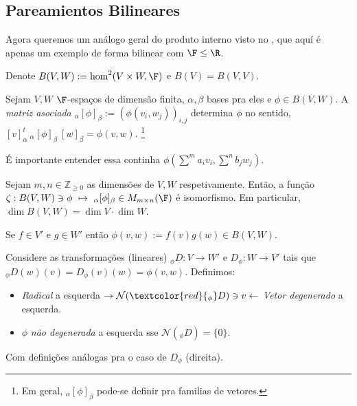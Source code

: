 \subsection{Pareamientos Bilineares}

Agora queremos um análogo geral do produto interno visto no \cite[Cáp. 7]{MA719}, que aquí é apenas um exemplo de forma bilinear com \(\F \leq \R\). 

\begin{note}
    Denote \(B(V,W) := \hom^2(V\times W, \F )\) e \(B(V) = B(V,V)\). 
\end{note}

\newcommand{\Fi}{_\alpha[\phi]_\beta}
\begin{definition}
    Sejam \(V, W \) \(\F\)-espaços de dimensão finita, \(\alpha, \beta\) bases pra eles e \(\phi \in B(V,W)\). A \emph{matriz asociada} \(_\alpha[\phi]_\beta := (\phi(v_i,w_j))_{i,j}\) determina \(\phi\) no sentido, \([v]_\alpha^t\  _\alpha[\phi]_\beta \  [w]_\beta = \phi (v,w)\). \footnote{Em geral, \(\Fi\) pode-se definir pra familias de vetores. } 
\end{definition}
\begin{note}
    É importante entender essa continha \(\phi\left(\sum^m a_i v_i, \sum^n b_j w_j\right)\).
\end{note} 
\begin{proposition}
    Sejam \(m,n \in \mathbb{Z}_{\geq 0}\) as dimensões de \(V, W\) respetivamente. Então, a função \(\zeta: B(V,W) \ni \phi \ \mapsto\  \Fi \in M_{m\times n}(\F)\) é isomorfismo. Em particular, \(\dim B(V,W) = \dim V \cdot \dim W\). %
\end{proposition}


\begin{example}
    Se \(f \in V'\) e \(g \in W'\) então \(\phi(v,w):= f(v)g(w) \in B(V,W)\). 
\end{example}

\begin{definition}
    Considere as transformações (lineares) \(_\phi D : V \to W'\) e \(D_\phi: W \to V'\) tais que \(_\phi D (w)(v) = D_\phi (v)(w) = \phi(v,w)\). Definimos: 
    \begin{itemize}
        \item \emph{Radical} a esquerda \( \rightarrow \mathcal{N}(\textcolor{red}{_\phi} D)  \ni v \leftarrow \) \emph{Vetor degenerado} a esquerda.  
        \item \(\phi\) \emph{não degenerada} a esquerda sse \(\mathcal{N}(_\phi D) = \{0\}\). 
    \end{itemize}
    Com definições análogas pra o caso de \(D_\phi\) (direita). 
\end{definition}

